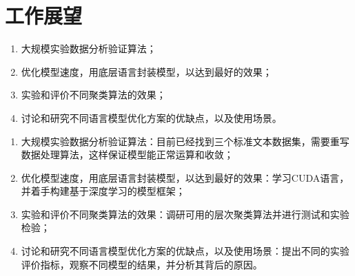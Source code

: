 \section*{工作展望}
\begin{enumerate}
\item 大规模实验数据分析验证算法；
\item 优化模型速度，用底层语言封装模型，以达到最好的效果；
\item 实验和评价不同聚类算法的效果；
\item 讨论和研究不同语言模型优化方案的优缺点，以及使用场景。
\end{enumerate}
\begin{enumerate}
\item 大规模实验数据分析验证算法：目前已经找到三个标准文本数据集，需要重写数据处理算法，这样保证模型能正常运算和收敛；
\item 优化模型速度，用底层语言封装模型，以达到最好的效果：学习CUDA语言，并着手构建基于深度学习的模型框架；
\item 实验和评价不同聚类算法的效果：调研可用的层次聚类算法并进行测试和实验检验；
\item 讨论和研究不同语言模型优化方案的优缺点，以及使用场景：提出不同的实验评价指标，观察不同模型的结果，并分析其背后的原因。
\end{enumerate} 